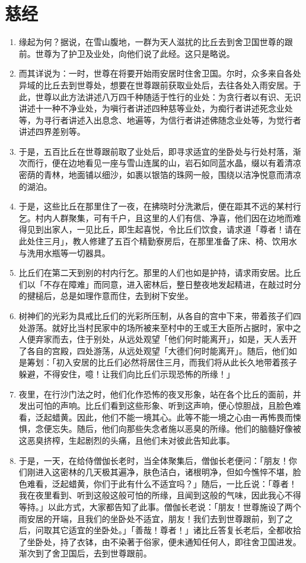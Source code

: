 \section{慈经}

\begin{enumerate}\item 缘起为何？据说，在雪山腹地，一群为天人滋扰的比丘去到舍卫国世尊的跟前。世尊为了护卫及业处，向他们说了此经。这只是略说。
\item 而其详说为：一时，世尊在将要开始雨安居时住舍卫国。尔时，众多来自各处异域的比丘去到世尊处，想要在世尊跟前获取业处后，去往各处入雨安居。于此，世尊以此方法讲述八万四千种随适于性行的业处：为贪行者以有识、无识讲述十一种不净业处，为嗔行者讲述四种慈等业处，为痴行者讲述死念业处等，为寻行者讲述入出息念、地遍等，为信行者讲述佛随念业处等，为觉行者讲述四界差别等。
\item 于是，五百比丘在世尊跟前取了业处后，即寻求适宜的坐卧处与行处村落，渐次而行，便在边地看见一座与雪山连属的山，岩石如同蓝水晶，缀以有着清凉密荫的青林，地面铺以细沙，如裹以银箔的珠网一般，围绕以洁净悦意而清凉的湖泊。
\item 于是，这些比丘在那里住了一夜，在拂晓时分洗漱后，便在距其不远的某村行乞。村内人群聚集，可有千户，且这里的人们有信、净喜，他们因在边地而难得见到出家人，一见比丘，即生起喜悦，令比丘们饮食，请求道「尊者！请在此处住三月」，教人修建了五百个精勤寮房后，在那里准备了床、椅、饮用水与洗用水瓶等一切器具。
\item 比丘们在第二天到别的村内行乞。那里的人们也如是护持，请求雨安居。比丘们以「不存在障难」而同意，进入密林后，整日整夜地发起精进，在敲过时分的揵槌后，总是如理作意而住，去到树下安坐。
\item 树神们的光彩为具戒比丘们的光彩所压制，从各自的宫中下来，带着孩子们四处游荡。就好比当村民家中的场所被来至村中的王或王大臣所占据时，家中之人便弃家而去，住于别处，从远处观望「他们何时能离开」，如是，天人丢开了各自的宫殿，四处游荡，从远处观望「大德们何时能离开」。随后，他们如是筹划：「初入安居的比丘们必然将居住三月，而我们将从此长久地带着孩子躲避，不得安住，噫！让我们向比丘们示现恐怖的所缘！」
\item 夜里，在行沙门法之时，他们化作恐怖的夜叉形象，站在各个比丘的面前，并发出可怕的声响。比丘们看到这些形象、听到这声响，便心惊胆战，且脸色难看，泛起蜡黄。因此，他们不能一境其心。此等不能一境之心由一再怖畏而悚惧，念便忘失。随后，他们向那些失念者施以恶臭的所缘。他们的脑髓好像被这恶臭挤榨，生起剧烈的头痛，且他们未对彼此告知此事。
\item 于是，一天，在给侍僧伽长老时，当全体聚集后，僧伽长老便问：「朋友！你们刚进入这密林的几天极其遍净，肤色洁白，诸根明净，但如今憔悴不堪，脸色难看，泛起蜡黄，你们于此有什么不适宜吗？」随后，一比丘说：「尊者！我在夜里看到、听到这般这般可怕的所缘，且闻到这般的气味，因此我心不得等持。」以此方式，大家都告知了此事。僧伽长老说：「朋友！世尊施设了两个雨安居的开端，且我们的坐卧处不适宜，朋友！我们去到世尊跟前，到了之后，问取其它适宜的坐卧处。」「善哉！尊者！」诸比丘答复长老后，全都收拾了坐卧处，持了衣钵，由不染著于俗家，便未通知任何人，即往舍卫国进发。渐次到了舍卫国后，去到世尊跟前。

\end{enumerate}
